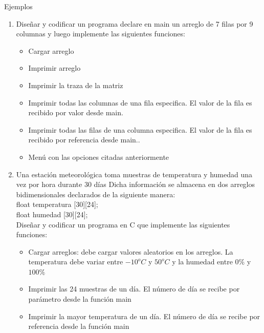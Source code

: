 \documentclass[xcolor=pdftex,table,11pt]{beamer}
\begin{document}
\begin{frame}[allowframebreaks]{Ejemplos}
 \begin{enumerate}
   
     \item Diseñar y codificar un programa declare en main un arreglo de 7 filas por 9 columnas y luego implemente las siguientes funciones:
      \begin{itemize}
      
   
     \item Cargar arreglo
     \item Imprimir arreglo
     \item Imprimir la traza de la matriz
	 \item Imprimir todas las columnas de una fila especifica. El valor de la fila es recibido por valor desde main.
	 \item Imprimir todas las filas de una columna especifica. El valor de la fila es recibido por referencia desde main..
	 \item Menú con las opciones citadas anteriormente
     
      \end{itemize}
\href{https://github.com/danis963/informaticaI_IUA/blob/main/c/src/7-funcion_triangulo.c}{}

\newpage

     \item Una estación meteorológica toma muestras de temperatura y humedad una vez por hora durante 30 días Dicha información se almacena en dos arreglos bidimensionales declarados de la siguiente manera: \\
      \vspace{0.35cm}
     float temperatura [30][24]; \\    
     float humedad [30][24];\\  
    \vspace{0.5cm}
Diseñar y codificar un programa en C que implemente las siguientes funciones:
      \begin{itemize}
      
   
     \item Cargar arreglos: debe cargar valores aleatorios en los  arreglos. La temperatura debe variar entre $-10^o C$ y $50 ^o C$ y la humedad entre  $0\%$ y $100 \%$ 
     \item Imprimir las 24 muestras de un día. El número de día se recibe por parámetro desde la función main
     \item Imprimir la mayor temperatura de un día. El número de día se recibe por referencia desde la función main
     

\end{itemize}
\end{enumerate}
\end{frame}
\end{document}
